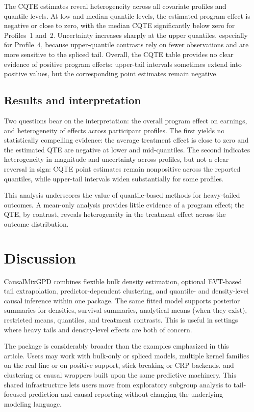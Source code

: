 \documentclass[11pt]{article}\usepackage[]{graphicx}\usepackage[]{xcolor}
\newcommand{\pkg}[1]{\textsf{#1}}
\begin{document}
The CQTE estimates reveal heterogeneity across all covariate profiles and quantile levels. At low and median quantile levels, the estimated program effect is negative or close to zero, with the median CQTE significantly below zero for Profiles~1 and~2. Uncertainty increases sharply at the upper quantiles, especially for Profile~4, because upper-quantile contrasts rely on fewer observations and are more sensitive to the spliced tail. Overall, the CQTE table provides no clear evidence of positive program effects: upper-tail intervals sometimes extend into positive values, but the corresponding point estimates remain negative.

\subsection{Results and interpretation}

Two questions bear on the interpretation: the overall program effect on earnings, and heterogeneity of effects across participant profiles. The first yields no statistically compelling evidence: the average treatment effect is close to zero and the estimated QTE are negative at lower and mid-quantiles. The second indicates heterogeneity in magnitude and uncertainty across profiles, but not a clear reversal in sign: CQTE point estimates remain nonpositive across the reported quantiles, while upper-tail intervals widen substantially for some profiles.

This analysis underscores the value of quantile-based methods for heavy-tailed outcomes. A mean-only analysis provides little evidence of a program effect; the QTE, by contrast, reveals heterogeneity in the treatment effect across the outcome distribution.

\section{Discussion}
\label{sec:discussion}

\pkg{CausalMixGPD} combines flexible bulk density estimation,
optional EVT-based tail extrapolation, predictor-dependent clustering,
and quantile- and density-level causal inference within one package.
The same fitted model supports posterior summaries for densities,
survival summaries, analytical means (when they exist), restricted means,
quantiles, and treatment contrasts. This is useful in settings where
heavy tails and density-level effects are both of concern.

The package is considerably broader than the examples
emphasized in this article.  Users may work with bulk-only or spliced
models, multiple kernel families on the real line or on positive
support, stick-breaking or CRP backends, and clustering or causal
wrappers built upon the same predictive machinery.  This shared
infrastructure lets users move from exploratory subgroup analysis to
tail-focused prediction and causal reporting without changing the
underlying modeling language.
\end{document}

